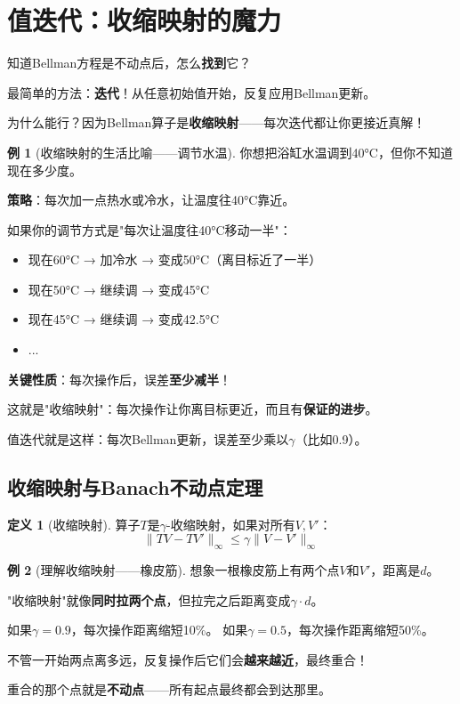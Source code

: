 \documentclass[11pt,a4paper]{article}
\theoremstyle{definition}
\newtheorem{definition}{定义}[section]
\newtheorem{example}{例}[section]
\begin{document}
\section{值迭代：收缩映射的魔力}

\begin{plainwords}
知道Bellman方程是不动点后，怎么\textbf{找到}它？

最简单的方法：\textbf{迭代}！从任意初始值开始，反复应用Bellman更新。

为什么能行？因为Bellman算子是\textbf{收缩映射}——每次迭代都让你更接近真解！
\end{plainwords}

\begin{example}[收缩映射的生活比喻——调节水温]
你想把浴缸水温调到40°C，但你不知道现在多少度。

\textbf{策略}：每次加一点热水或冷水，让温度往40°C靠近。

如果你的调节方式是"每次让温度往40°C移动一半"：
\begin{itemize}
    \item 现在60°C → 加冷水 → 变成50°C（离目标近了一半）
    \item 现在50°C → 继续调 → 变成45°C
    \item 现在45°C → 继续调 → 变成42.5°C
    \item ...
\end{itemize}

\textbf{关键性质}：每次操作后，误差\textbf{至少减半}！

这就是"收缩映射"：每次操作让你离目标更近，而且有\textbf{保证的进步}。

值迭代就是这样：每次Bellman更新，误差至少乘以$\gamma$（比如0.9）。
\end{example}

\subsection{收缩映射与Banach不动点定理}

\begin{definition}[收缩映射]
算子$T$是$\gamma$-收缩映射，如果对所有$V, V'$：
\[
\|TV - TV'\|_\infty \leq \gamma \|V - V'\|_\infty
\]
\end{definition}

\begin{example}[理解收缩映射——橡皮筋]
想象一根橡皮筋上有两个点$V$和$V'$，距离是$d$。

"收缩映射"就像\textbf{同时拉两个点}，但拉完之后距离变成$\gamma \cdot d$。

如果$\gamma = 0.9$，每次操作距离缩短10\%。
如果$\gamma = 0.5$，每次操作距离缩短50\%。

不管一开始两点离多远，反复操作后它们会\textbf{越来越近}，最终重合！

重合的那个点就是\textbf{不动点}——所有起点最终都会到达那里。
\end{example}
\end{document}
